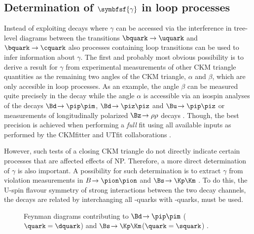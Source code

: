 \subsection[head={Determination of $\gamma$ in loop processes},tocentry={Determination of $\gamma$ in loop processes}]{Determination of $\symbfsf{\gamma}$ in loop processes}
\label{sec:gamamInLoops}

Instead of exploiting decays where $\gamma$ can be accessed via the interference in tree-level diagrams between the transitions $\bquark\to\uquark$ and $\bquark\to\cquark$ also processes containing loop transitions can be used to infer information about $\gamma$.
The first and probably most obvious possibility is to derive a result for $\gamma$ from experimental measurements of other CKM triangle quantities as the remaining two angles of the CKM triangle, $\alpha$ and $\beta$, which are only accesible in loop processes.
As an example, the angle $\beta$ can be measured quite precisely in the decay \mbox{\BdToJPsiKS} while the angle $\alpha$ is accessible via an isospin analyses of the decays $\Bd\!\to\pip\pim$, $\Bd\!\to\piz\piz$ and $\Bu\!\to\pip\piz$ \cite{IsospinAlpha} or measurements of longitudinally polarized $\Bz\!\to\rho\rho$ decays \cite{alpha_BaBar, alpha_Belle}. Though, the best precision is achieved when performing a \emph{full} fit using all available inputs as performed by the CKMfitter and UTfit collaborations \cite{CKMfitter2015, UTfit-UT}.

However, such tests of a closing CKM triangle do not directly indicate certain processes that are affected effects of \ac{NP}.
Therefore, a more direct determination of $\gamma$ is also important.
A possibility for such determination is to extract $\gamma$ from \CP violation measurements in $B\!\to\pion\pion$ and $\Bs\!\to\Kp\Km$ \cite{GammaInLoops_Fleischer, GammaInLoops_Ciuchini}.
To do this, the U-spin flavour symmetry of strong interactions between the two decay channels, \ie the decays are related by interchanging all \dquark-quarks with \squark-quarks, must be used.
\begin{figure}[tbp]
	\centering
	
	\hfill
	
	\caption{Feynman diagrams contributing to $\Bd\!\to\pip\pim$ ($\quark=\dquark$) and $\Bs\!\to\Kp\Km$($\quark=\squark$) \cite{Ellis:2016jkw}.}
	\label{fig:feynmanGammaLoops}
\end{figure}

